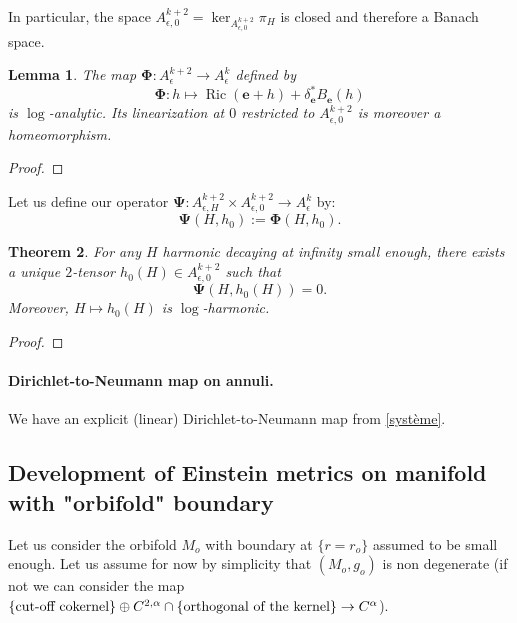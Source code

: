 \documentclass[12pt]{article}
\newtheorem{thm}{Theorem}[section]
\newtheorem{lem}[thm]{Lemma}
\DeclareMathOperator{\Ric}{\operatorname{Ric}}
\begin{document}
        In particular, the space $A_{\epsilon,0}^{k+2} = \ker_{A_{\epsilon,0}^{k+2}} \pi_H$ is closed and therefore a Banach space.
    
    \begin{lem}\label{invertibility linearization}
        The map $\mathbf{\Phi}: A^{k+2}_\epsilon\to A^{k}_\epsilon$ defined by
        $$\mathbf{\Phi}: h\mapsto \Ric(\mathbf{e}+h)+ \delta^*_{\mathbf{e}}B_{\mathbf{e}}(h)$$
        is $\log$-analytic. Its linearization at $0$ restricted to $A_{\epsilon,0}^{k+2}$ is moreover a homeomorphism.
    \end{lem}
    \begin{proof}
    \end{proof}
    
    
    Let us define our operator $\mathbf{\Psi}:A_{\epsilon,H}^{k+2}\times A_{\epsilon,0}^{k+2}\to A_{\epsilon}^k$ by:
    $$ \mathbf{\Psi}(H,h_0):= \mathbf{\Phi}(H,h_0). $$
    
    \begin{thm}
        For any $ H $ harmonic decaying at infinity small enough, there exists a unique $2$-tensor $h_0(H)\in A_{\epsilon,0}^{k+2}$ such that $$\mathbf{\Psi}(H,h_0(H)) = 0.$$
        Moreover, $H\mapsto h_0(H)$ is $\log$-harmonic.
    \end{thm}
    \begin{proof}
    \end{proof}
    
    \paragraph{Dirichlet-to-Neumann map on annuli.}
    
    We have an explicit (linear) Dirichlet-to-Neumann map from \eqref{système}.
    
    
    \subsection{Development of Einstein metrics on manifold with "orbifold" boundary}
    
    Let us consider the orbifold $M_o$ with boundary at $\{r = r_o\}$ assumed to be small enough. Let us assume for now by simplicity that $(M_o,g_o)$ is non degenerate (if not we can consider the map $\{\text{cut-off cokernel}\} \oplus C^{2,\alpha}\cap\{\textup{orthogonal of the kernel}\} \to C^{\alpha}$).
    
\end{document}
